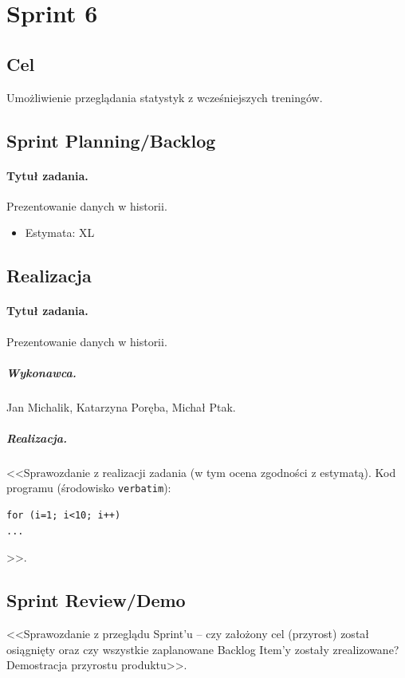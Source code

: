 \documentclass[a4paper]{article}
\begin{document}
\section{Sprint 6}

\subsection{Cel} Umożliwienie przeglądania statystyk z wcześniejszych treningów.

\subsection{Sprint Planning/Backlog}

\paragraph{Tytuł zadania.} Prezentowanie danych w historii.
\begin{itemize}
\item Estymata: XL
\end{itemize}

\subsection{Realizacja}

\paragraph{Tytuł zadania.} Prezentowanie danych w historii.
\subparagraph{Wykonawca.} Jan Michalik, Katarzyna Poręba, Michał Ptak.
\subparagraph{Realizacja.} <<Sprawozdanie z realizacji zadania (w tym ocena zgodności z estymatą). Kod programu (środowisko \texttt{verbatim}): \begin{verbatim}
for (i=1; i<10; i++)
...
\end{verbatim}>>.



\subsection{Sprint Review/Demo}
<<Sprawozdanie z przeglądu Sprint'u -- czy założony cel (przyrost) został osiągnięty oraz czy wszystkie zaplanowane Backlog Item'y zostały zrealizowane? Demostracja przyrostu produktu>>.
\end{document}
